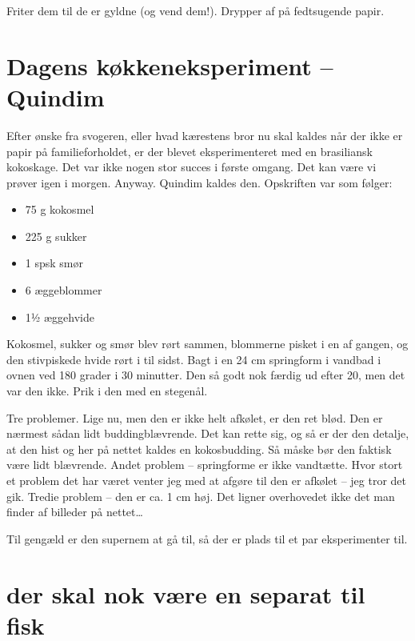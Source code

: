 \documentclass[
  letterpaper,
  DIV=11,
  numbers=noendperiod]{scrreprt}
\providecommand{\tightlist}{%
  \setlength{\itemsep}{0pt}\setlength{\parskip}{0pt}}\usepackage{longtable,booktabs,array}
\begin{document}
Friter dem til de er gyldne (og vend dem!). Drypper af på fedtsugende
papir.

\hypertarget{dagens-kuxf8kkeneksperiment-quindim}{%
\section{Dagens køkkeneksperiment --
Quindim}\label{dagens-kuxf8kkeneksperiment-quindim}}

Efter ønske fra svogeren, eller hvad kærestens bror nu skal kaldes når
der ikke er papir på familieforholdet, er der blevet eksperimenteret med
en brasiliansk kokoskage. Det var ikke nogen stor succes i første
omgang. Det kan være vi prøver igen i morgen. Anyway. Quindim kaldes
den. Opskriften var som følger:

\begin{itemize}
\tightlist
\item
  75 g kokosmel
\item
  225 g sukker
\item
  1 spsk smør
\item
  6 æggeblommer
\item
  1½ æggehvide
\end{itemize}

Kokosmel, sukker og smør blev rørt sammen, blommerne pisket i en af
gangen, og den stivpiskede hvide rørt i til sidst. Bagt i en 24 cm
springform i vandbad i ovnen ved 180 grader i 30 minutter. Den så godt
nok færdig ud efter 20, men det var den ikke. Prik i den med en
stegenål.

Tre problemer. Lige nu, men den er ikke helt afkølet, er den ret blød.
Den er nærmest sådan lidt buddingblævrende. Det kan rette sig, og så er
der den detalje, at den hist og her på nettet kaldes en kokosbudding. Så
måske bør den faktisk være lidt blævrende. Andet problem -- springforme
er ikke vandtætte. Hvor stort et problem det har været venter jeg med at
afgøre til den er afkølet -- jeg tror det gik. Tredie problem -- den er
ca. 1 cm høj. Det ligner overhovedet ikke det man finder af billeder på
nettet\ldots{}

Til gengæld er den supernem at gå til, så der er plads til et par
eksperimenter til.

\hypertarget{der-skal-nok-vuxe6re-en-separat-til-fisk}{%
\section{der skal nok være en separat til
fisk}\label{der-skal-nok-vuxe6re-en-separat-til-fisk}}
\end{document}

